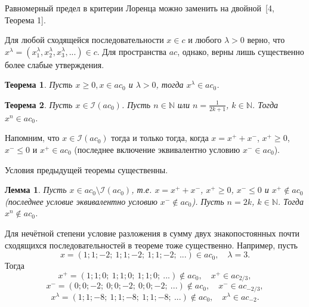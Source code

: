 \documentclass[14pt, a4paper]{extbook}
\newtheorem{theorem}{Теорема}
\newtheorem{lemma}{Лемма}
\begin{document}
Равномерный предел в критерии Лоренца можно заменить на двойной~[4, Теорема 1].

Для любой сходящейся последовательности $x\in c$ и любого $\lambda > 0$ верно, что
$x^\lambda = (x_1^\lambda,x_2^\lambda,x_3^\lambda,...) \in c$.
Для пространства $ac$, однако, верны лишь существенно более слабые утверждения.


	\begin{theorem}
		\label{thm:Zvol_pow_pos}
		Пусть $x \geqslant 0, x \in a c_0$ и $\lambda>0$, тогда $x^\lambda \in a c_0$.
	\end{theorem}

	\begin{theorem}
		\label{thm:Zvol_pow_composed}
		Пусть $x\in \mathcal{I}(ac_0)$.
		Пусть $n\in\mathbb{N}$ или $n = \frac1{2k+1}$, $k\in\mathbb{N}$.
		Тогда $x^n \in ac_0$.
	\end{theorem}

	Напомним, что $x\in \mathcal{I}(ac_0)$ тогда и только тогда, когда $x = x^+ +x^-$, $x^+\geq 0$, $x^- \leq 0$ и $x^+ \in ac_0$
	(последнее включение эквивалентно условию $x^- \in ac_0$).

	Условия предыдущей теоремы существенны.

	\begin{lemma}
		\label{thm:ac0_pow_even}
		Пусть $x\in ac_0 \setminus \mathcal{I}(ac_0)$, т.е. $x = x^+ +x^-$, $x^+\geq 0$, $x^- \leq 0$ и $x^+ \notin ac_0$
		(последнее условие эквивалентно условию $x^- \notin ac_0$).
		Пусть $n = 2k$, $k\in\mathbb{N}$.
		Тогда $x^n \notin ac_0$.
	\end{lemma}






		Для нечётной степени условие разложения в сумму двух знакопостоянных
		почти сходящихся последовательностей в теореме тоже существенно.
		Например, пусть
		\begin{equation*}
			x = (1;1;-2;\ 1;1;-2;\ 1;1;-2;\ ...) \in ac_0
			,
			\quad
			\lambda = 3
			.
		\end{equation*}
		Тогда
		\begin{equation*}
			x^+ = (1;1;0;\ 1;1;0;\ 1;1;0;\ ...) \notin ac_0, \quad x^+ \in ac_{2/3}
			,
		\end{equation*}
		\begin{equation*}
			x^- = (0;0;-2;\ 0;0;-2;\ 0;0;-2;\ ...) \notin ac_0, \quad x^- \in ac_{-2/3}
			,
		\end{equation*}
		\begin{equation*}
			x^\lambda = (1;1;-8;\ 1;1;-8;\ 1;1;-8;\ ...) \notin ac_0, \quad x^\lambda \in ac_{-2}
			.
		\end{equation*}
\end{document}
